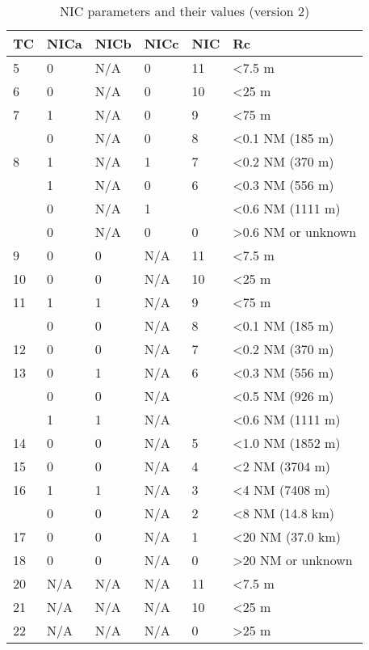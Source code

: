 \begin{table}[!ht]
\caption{NIC parameters and their values (version 2)}
\label{tb:nic-params-v2}
\begin{tabular}{|l|l|l|l|l|l|}
\hline
\textbf{TC} & \textbf{NICa} & \textbf{NICb} & \textbf{NICc} & \textbf{NIC} & \textbf{Rc} \\ \hline \hline
5 & 0 & N/A & 0 & 11 & \textless 7.5 m \\ \hline
6 & 0 & N/A & 0 & 10 & \textless 25 m \\ \hline
7 & 1 & N/A & 0 & 9 & \textless 75 m \\ \cline{2-6}
 & 0 & N/A & 0 & 8 & \textless 0.1 NM (185 m) \\ \hline
8 & 1 & N/A & 1 & 7 & \textless 0.2 NM (370 m) \\ \cline{2-6}
 & 1 & N/A & 0 & 6 & \textless 0.3 NM (556 m) \\ \cline{2-4} \cline{6-6}
 & 0 & N/A & 1 &  & \textless 0.6 NM (1111 m) \\ \cline{2-6}
 & 0 & N/A & 0 & 0 & \textgreater 0.6 NM or unknown \\ \hline
9 & 0 & 0 & N/A & 11 & \textless 7.5 m \\ \hline
10 & 0 & 0 & N/A & 10 & \textless 25 m \\ \hline
11 & 1 & 1 & N/A & 9 & \textless 75 m \\ \cline{2-6}
 & 0 & 0 & N/A & 8 & \textless 0.1 NM (185 m) \\ \hline
12 & 0 & 0 & N/A & 7 & \textless 0.2 NM (370 m) \\ \hline
13 & 0 & 1 & N/A & 6 & \textless 0.3 NM (556 m) \\ \cline{2-4} \cline{6-6}
 & 0 & 0 & N/A &  & \textless 0.5 NM (926 m) \\ \cline{2-4} \cline{6-6}
 & 1 & 1 & N/A &  & \textless 0.6 NM (1111 m) \\ \hline
14 & 0 & 0 & N/A & 5 & \textless 1.0 NM (1852 m) \\ \hline
15 & 0 & 0 & N/A & 4 & \textless 2 NM (3704 m) \\ \hline
16 & 1 & 1 & N/A & 3 & \textless 4 NM (7408 m) \\ \cline{2-6}
 & 0 & 0 & N/A & 2 & \textless 8 NM (14.8 km) \\ \hline
17 & 0 & 0 & N/A & 1 & \textless 20 NM (37.0 km) \\ \hline
18 & 0 & 0 & N/A & 0 & \textgreater 20 NM or unknown \\ \hline
20 & N/A & N/A & N/A & 11 & \textless 7.5 m \\ \hline
21 & N/A & N/A & N/A & 10 & \textless 25 m \\ \hline
22 & N/A & N/A & N/A & 0 & \textgreater 25 m \\ \hline
\end{tabular}
\end{table}


